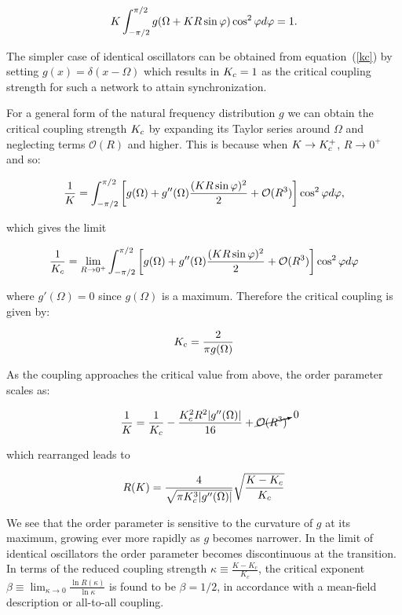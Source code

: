 \begin{align}
     K\int_{-\pi/2}^{\pi/2} g(\Omega + K R \sin\varphi) \cos^2\varphi d\varphi = 1.
     \label{kc}
\end{align}

The simpler case of identical oscillators can be obtained from equation~(\ref{kc}) by setting $g(x) = \delta(x-\Omega)$ which results
in $K_c = 1$ as the critical coupling strength for such a network to attain synchronization.

For a general form of the natural frequency distribution $g$ we can obtain the critical coupling strength $K_c$ by expanding its
Taylor series around $\Omega$ and neglecting terms $\mathcal{O}(R)$ and higher. This is because when $K \to K_c^+$, $R \to 0^+$ and
so:

\begin{equation*}
	\frac{1}{K} = \int_{-\pi/2}^{\pi/2} \left[ g(\Omega) + g''(\Omega)\frac{(K R \sin\varphi)^2}{2} + \mathcal{O}(R^3) \right]
	\cos^2\varphi d\varphi, \\[10pt]
\end{equation*}

\noindent which gives the limit

\begin{equation*}
	\frac{1}{K_c} = \lim_{R\to0^+} \int_{-\pi/2}^{\pi/2} \left[ g(\Omega) + g''(\Omega)\frac{(K R \sin\varphi)^2}{2} + \mathcal{O}(R^3) \right] \cos^2\varphi d\varphi
\end{equation*}

\noindent where $g'(\Omega)=0$ since $g(\Omega)$ is a maximum. Therefore the critical coupling is given by:

\begin{align}
    K_c = \frac{2}{\pi g(\Omega)}
\end{align}

As the coupling approaches the critical value from above, the order parameter scales as:

\begin{equation*}
    \frac{1}{K} = \frac{1}{K_c} - \frac{K_c^2 R^2|g''(\Omega)| }{16} + \cancelto{0}{\mathcal{O}(R^3)}
\end{equation*}

\noindent which rearranged leads to

\begin{equation}
    R(K) = \frac{4}{\sqrt{\pi K_c^3|g''(\Omega)|}} \sqrt{\frac{K - K_c}{K_c}}
\end{equation}

We see that the order parameter is sensitive to the curvature of $g$ at its maximum, growing ever more rapidly as $g$ becomes narrower.
In the limit of identical oscillators the order parameter becomes discontinuous at the transition. In terms of the reduced coupling
strength $\kappa \equiv \frac{K-K_c}{K_c}$, the critical exponent $\beta \equiv \lim_{\kappa \to 0}\frac{\ln R(\kappa)}{\ln\kappa}$ is
found to be $\beta = 1/2$, in accordance with a mean-field description or all-to-all coupling.

